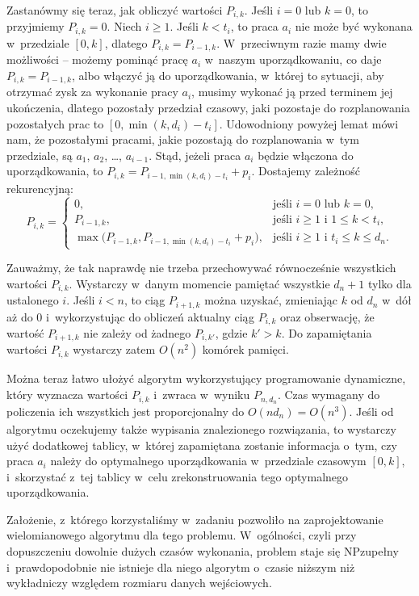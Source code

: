 Zastanówmy się teraz, jak obliczyć wartości $P_{i,k}$.
Jeśli $i=0$ lub $k=0$, to przyjmiemy $P_{i,k}=0$.
Niech $i\ge1$.
Jeśli $k<t_i$, to praca $a_i$ nie może być wykonana w~przedziale $[0,k]$, dlatego $P_{i,k}=P_{i-1,k}$.
W~przeciwnym razie mamy dwie możliwości -- możemy pominąć pracę $a_i$ w~naszym uporządkowaniu, co daje $P_{i,k}=P_{i-1,k}$, albo włączyć ją do uporządkowania, w~której to sytuacji, aby otrzymać zysk za wykonanie pracy $a_i$, musimy wykonać ją przed terminem jej ukończenia, dlatego pozostały przedział czasowy, jaki pozostaje do rozplanowania pozostałych prac to $[0,\min(k,d_i)-t_i]$.
Udowodniony powyżej lemat mówi nam, że pozostałymi pracami, jakie pozostają do rozplanowania w~tym przedziale, są $a_1$, $a_2$, \dots, $a_{i-1}$.
Stąd, jeżeli praca $a_i$ będzie włączona do uporządkowania, to $P_{i,k}=P_{i-1,\min(k,d_i)-t_i}+p_i$.
Dostajemy zależność rekurencyjną:
\[
	P_{i,k} = \begin{cases}
		0, & \text{jeśli $i=0$ lub $k=0$}, \\
		P_{i-1,k}, & \text{jeśli $i\ge1$ i~$1\le k<t_i$}, \\
		\max\bigl(P_{i-1,k},P_{i-1,\min(k,d_i)-t_i}+p_i\bigr), & \text{jeśli $i\ge1$ i~$t_i\le k\le d_n$}.
	\end{cases}
\]

Zauważmy, że tak naprawdę nie trzeba przechowywać równocześnie wszystkich wartości $P_{i,k}$.
Wystarczy w~danym momencie pamiętać wszystkie $d_n+1$ tylko dla ustalonego $i$.
Jeśli $i<n$, to ciąg $P_{i+1,k}$ można uzyskać, zmieniając $k$ od $d_n$ w~dół aż do 0 i~wykorzystując do obliczeń aktualny ciąg $P_{i,k}$ oraz obserwację, że wartość $P_{i+1,k}$ nie zależy od żadnego $P_{i,k'}$, gdzie $k'>k$.
Do zapamiętania wartości $P_{i,k}$ wystarczy zatem $O(n^2)$ komórek pamięci.

Można teraz łatwo ułożyć algorytm wykorzystujący programowanie dynamiczne, który wyznacza wartości $P_{i,k}$ i~zwraca w~wyniku $P_{n,d_n}$\!.
Czas wymagany do policzenia ich wszystkich jest proporcjonalny do $O(nd_n)=O(n^3)$.
Jeśli od algorytmu oczekujemy także wypisania znalezionego rozwiązania, to wystarczy użyć dodatkowej tablicy, w~której zapamiętana zostanie informacja o~tym, czy praca $a_i$ należy do optymalnego uporządkowania w~przedziale czasowym $[0,k]$, i~skorzystać z~tej tablicy w~celu zrekonstruowania tego optymalnego uporządkowania.

Założenie, z~którego korzystaliśmy w~zadaniu pozwoliło na zaprojektowanie wielomianowego algorytmu dla tego problemu.
W~ogólności, czyli przy dopuszczeniu dowolnie dużych czasów wykonania, problem staje się NP\nbhyphen zupełny i~prawdopodobnie nie istnieje dla niego algorytm o~czasie niższym niż wykładniczy względem rozmiaru danych wejściowych.
